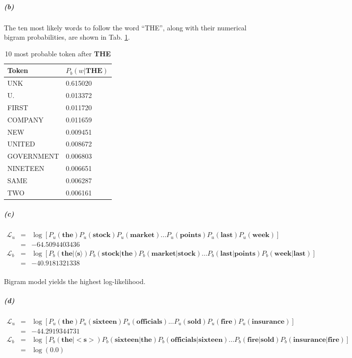 \documentclass{article}
\begin{document}
\subparagraph*{(b)}
The ten most likely words to follow the word “THE”, along with their numerical bigram probabilities, are shown in Tab. \ref{3.5b}.

\begin{table}[h]
	\centering
	\begin{tabular}{|p{5cm}|p{5cm}|}
		\hline
		Token & $P_b(w|\mathbf{THE})$ \\
		\hline
		\textlangle UNK \textrangle & 0.615020 \\
		\hline
		U. & 0.013372 \\
		\hline
		FIRST & 0.011720 \\
		\hline
		COMPANY & 0.011659 \\
		\hline
		NEW & 0.009451 \\
		\hline
		UNITED & 0.008672 \\
		\hline
		GOVERNMENT & 0.006803 \\
		\hline
		NINETEEN & 0.006651 \\
		\hline
		SAME & 0.006287 \\
		\hline
		TWO & 0.006161 \\
		\hline
	\end{tabular}
	\caption{10 most probable token after \textbf{THE}}
	\label{3.5b}
\end{table}

\subparagraph*{(c)}
\begin{eqnarray*}
\mathcal{L}_u &=& \log[P_u(\mathbf{the}) P_u(\mathbf{stock}) P_u(\mathbf{market}) ... P_u(\mathbf{points}) P_u(\mathbf{last}) P_u(\mathbf{week})]\\
&=&-64.5094403436\\
\mathcal{L}_b &=& \log[P_b(\mathbf{the|\langle s \rangle}) P_b(\mathbf{stock|the}) P_b(\mathbf{market|stock}) ... P_b(\mathbf{last|points}) P_b(\mathbf{week|last})]\\
&=&-40.9181321338\\
\end{eqnarray*}

Bigram model yields the highest log-likelihood.

\subparagraph*{(d)}
\begin{eqnarray*}
	\mathcal{L}_u &=& \log[P_u(\mathbf{the}) P_u(\mathbf{sixteen}) P_u(\mathbf{officials}) ... P_u(\mathbf{sold}) P_u(\mathbf{fire}) P_u(\mathbf{insurance})]\\
	&=&-44.2919344731\\
	\mathcal{L}_b &=& \log[P_b(\mathbf{the|<s>}) P_b(\mathbf{sixteen|the}) P_b(\mathbf{officials|sixteen}) ... P_b(\mathbf{fire|sold}) P_b(\mathbf{insurance|fire})]\\
	&=&\log(0.0)\\
\end{eqnarray*}
\end{document}
